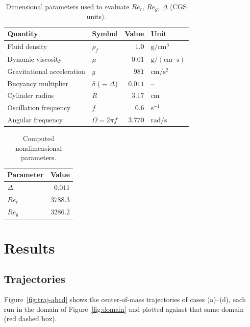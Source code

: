 \documentclass[11pt]{article}
\begin{document}
\begin{table}[h]
    \centering
    \caption{Dimensional parameters used to evaluate $Re_r$, $Re_g$, $\Delta$
    (CGS units).}
    \label{tab:nondim-inputs}
    \begin{tabular}{llrl}
        \toprule
        Quantity & Symbol & Value & Unit \\
        \midrule
        Fluid density & $\rho_f$ & $1.0$ & $\mathrm{g/cm^3}$ \\
        Dynamic viscosity & $\mu$ & $0.01$ & $\mathrm{g/(cm \cdot s)}$ \\
        Gravitational acceleration & $g$ & $981$ & $\mathrm{cm/s^2}$ \\
        Buoyancy multiplier & $\delta$ ($\equiv \Delta$) & $0.011$ & -- \\
        Cylinder radius & $R$ & $3.17$ & $\mathrm{cm}$ \\
        Oscillation frequency & $f$ & $0.6$ & $\mathrm{s^{-1}}$ \\
        Angular frequency & $\Omega = 2\pi f$ & $3.770$ & $\mathrm{rad/s}$ \\
        \bottomrule
    \end{tabular}
\end{table}

\begin{table}[h]
    \centering
    \caption{Computed nondimensional parameters.}
    \label{tab:nondim-results}
    \begin{tabular}{lr}
        \toprule
        Parameter & Value \\
        \midrule
        $\Delta$ & $0.011$ \\
        $Re_r$ & $3788.3$ \\
        $Re_g$ & $3286.2$ \\
        \bottomrule
    \end{tabular}
\end{table}

\section{Results}

\subsection{Trajectories}

Figure~\ref{fig:traj-abcd} shows the center-of-mass trajectories of cases
(a)--(d), each run in the domain of Figure~\ref{fig:domain} and plotted
against that same domain (red dashed box).
\end{document}
